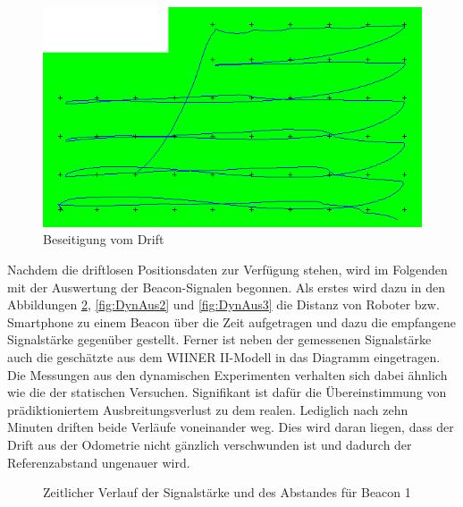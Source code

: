 \begin{figure}[H] 
\centering
\includegraphics[scale=0.38]{Bilder/NoDrift}
\caption{Beseitigung vom Drift}
\label{fig:NoDrift}
\end{figure}
Nachdem die driftlosen Positionsdaten zur Verfügung stehen, wird im Folgenden mit der Auswertung der Beacon-Signalen begonnen. Als erstes wird dazu in den Abbildungen \ref{fig:DynAus1}, \ref{fig:DynAus2} und \ref{fig:DynAus3} die Distanz von Roboter bzw. Smartphone zu einem Beacon über die Zeit aufgetragen und dazu die empfangene Signalstärke gegenüber gestellt. Ferner ist neben der gemessenen Signalstärke auch die geschätzte aus dem WIINER II-Modell in das Diagramm eingetragen. Die Messungen aus den dynamischen Experimenten verhalten sich dabei ähnlich wie die der statischen Versuchen. Signifikant ist dafür die Übereinstimmung von prädiktioniertem Ausbreitungsverlust zu dem realen. Lediglich nach zehn Minuten driften beide Verläufe voneinander weg. Dies wird daran liegen, dass der Drift aus der Odometrie nicht gänzlich verschwunden ist und dadurch der Referenzabstand ungenauer wird.  
\begin{figure}[H] 
\centering
{}
\caption{Zeitlicher Verlauf der Signalstärke und des Abstandes für Beacon 1}
\label{fig:DynAus1}
\end{figure}
